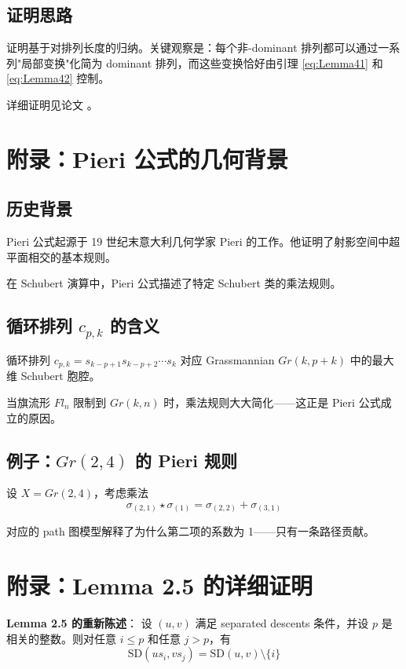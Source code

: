 \subsection*{证明思路}
证明基于对排列长度的归纳。关键观察是：每个非-dominant 排列都可以通过一系列"局部变换"化简为 dominant 排列，而这些变换恰好由引理 \cref{eq:Lemma41} 和 \cref{eq:Lemma42} 控制。

详细证明见论文 \cite[ Section 6]{Sa}。

\section{附录：Pieri 公式的几何背景}
\label{sec:appendix-ch2-pieri}

\subsection*{历史背景}
Pieri 公式起源于 19 世纪末意大利几何学家 Pieri 的工作。他证明了射影空间中超平面相交的基本规则。

在 Schubert 演算中，Pieri 公式描述了特定 Schubert 类的乘法规则。

\subsection*{循环排列 $c_{p,k}$ 的含义}
循环排列 $c_{p,k} = s_{k-p+1} s_{k-p+2} \cdots s_k$ 对应 Grassmannian $Gr(k, p+k)$ 中的最大维 Schubert 胞腔。

当旗流形 $Fl_n$ 限制到 $Gr(k, n)$ 时，乘法规则大大简化——这正是 Pieri 公式成立的原因。

\subsection*{例子：$Gr(2,4)$ 的 Pieri 规则}
设 $X = Gr(2,4)$，考虑乘法
$$\sigma_{(2,1)} \star \sigma_{(1)} = \sigma_{(2,2)} + \sigma_{(3,1)}$$

对应的 path 图模型解释了为什么第二项的系数为 1——只有一条路径贡献。

\section{附录：Lemma 2.5 的详细证明}
\label{sec:appendix-ch2-lemma25}

\textbf{Lemma 2.5 的重新陈述}：
设 $(u, v)$ 满足 separated descents 条件，并设 $p$ 是相关的整数。则对任意 $i \leq p$ 和任意 $j > p$，有
$$\mathrm{SD}(us_i, vs_j) = \mathrm{SD}(u, v) \setminus \{i\}$$

